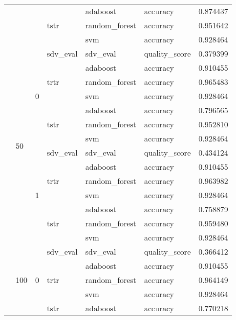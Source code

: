 \begin{longtable}{llllllr}
\cline{4-7} \cline{5-7}
 &  &  & \multirow[t]{3}{*}{tstr} & adaboost & accuracy & 0.874437 \\
\cline{5-7}
 &  &  &  & random_forest & accuracy & 0.951642 \\
\cline{5-7}
 &  &  &  & svm & accuracy & 0.928464 \\
\cline{2-7} \cline{3-7} \cline{4-7} \cline{5-7}
 & \multirow[t]{14}{*}{50} & \multirow[t]{7}{*}{0} & sdv_eval & sdv_eval & quality_score & 0.379399 \\
\cline{4-7} \cline{5-7}
 &  &  & \multirow[t]{3}{*}{trtr} & adaboost & accuracy & 0.910455 \\
\cline{5-7}
 &  &  &  & random_forest & accuracy & 0.965483 \\
\cline{5-7}
 &  &  &  & svm & accuracy & 0.928464 \\
\cline{4-7} \cline{5-7}
 &  &  & \multirow[t]{3}{*}{tstr} & adaboost & accuracy & 0.796565 \\
\cline{5-7}
 &  &  &  & random_forest & accuracy & 0.952810 \\
\cline{5-7}
 &  &  &  & svm & accuracy & 0.928464 \\
\cline{3-7} \cline{4-7} \cline{5-7}
 &  & \multirow[t]{7}{*}{1} & sdv_eval & sdv_eval & quality_score & 0.434124 \\
\cline{4-7} \cline{5-7}
 &  &  & \multirow[t]{3}{*}{trtr} & adaboost & accuracy & 0.910455 \\
\cline{5-7}
 &  &  &  & random_forest & accuracy & 0.963982 \\
\cline{5-7}
 &  &  &  & svm & accuracy & 0.928464 \\
\cline{4-7} \cline{5-7}
 &  &  & \multirow[t]{3}{*}{tstr} & adaboost & accuracy & 0.758879 \\
\cline{5-7}
 &  &  &  & random_forest & accuracy & 0.959480 \\
\cline{5-7}
 &  &  &  & svm & accuracy & 0.928464 \\
\cline{2-7} \cline{3-7} \cline{4-7} \cline{5-7}
 & \multirow[t]{14}{*}{100} & \multirow[t]{7}{*}{0} & sdv_eval & sdv_eval & quality_score & 0.366412 \\
\cline{4-7} \cline{5-7}
 &  &  & \multirow[t]{3}{*}{trtr} & adaboost & accuracy & 0.910455 \\
\cline{5-7}
 &  &  &  & random_forest & accuracy & 0.964149 \\
\cline{5-7}
 &  &  &  & svm & accuracy & 0.928464 \\
\cline{4-7} \cline{5-7}
 &  &  & \multirow[t]{3}{*}{tstr} & adaboost & accuracy & 0.770218 \\

\end{longtable}
